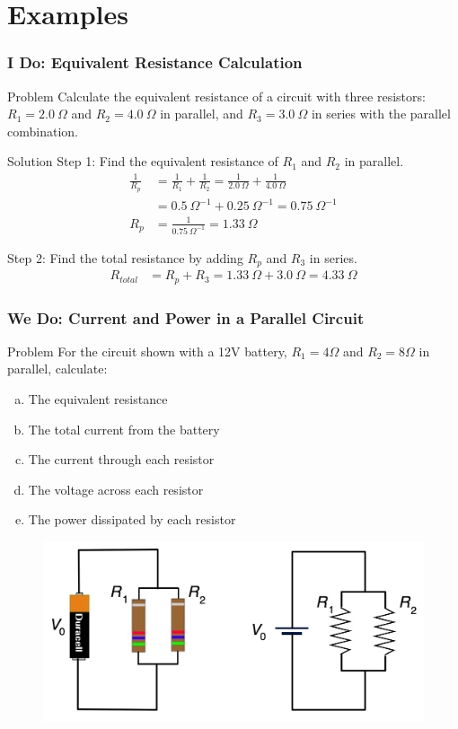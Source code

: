 \documentclass{beamer}
\begin{document}
\section{Examples}
\begin{frame}
    \frametitle{I Do: Equivalent Resistance Calculation}
    \begin{block}{Problem}
        Calculate the equivalent resistance of a circuit with three resistors: $R_1 = 2.0~\Omega$ and $R_2 = 4.0~\Omega$ in parallel, and $R_3 = 3.0~\Omega$ in series with the parallel combination.
    \end{block}
    \begin{block}{Solution}
        Step 1: Find the equivalent resistance of $R_1$ and $R_2$ in parallel.
        \begin{align*}
            \frac{1}{R_p} &= \frac{1}{R_1} + \frac{1}{R_2} = \frac{1}{2.0~\Omega} + \frac{1}{4.0~\Omega}\\
            &= 0.5~\Omega^{-1} + 0.25~\Omega^{-1} = 0.75~\Omega^{-1}\\
            R_p &= \frac{1}{0.75~\Omega^{-1}} = 1.33~\Omega
        \end{align*}
        
        Step 2: Find the total resistance by adding $R_p$ and $R_3$ in series.
        \begin{align*}
            R_{total} &= R_p + R_3 = 1.33~\Omega + 3.0~\Omega = 4.33~\Omega
        \end{align*}
    \end{block}
\end{frame}

\begin{frame}
    \frametitle{We Do: Current and Power in a Parallel Circuit}
    \begin{block}{Problem}
        For the circuit shown with a 12V battery, $R_1 = 4\Omega$ and $R_2 = 8\Omega$ in parallel, calculate:
        \begin{enumerate}[(a)]
            \item The equivalent resistance
            \item The total current from the battery
            \item The current through each resistor
            \item The voltage across each resistor
            \item The power dissipated by each resistor
        \end{enumerate}
    \end{block}
    \begin{figure}
        \centering
        \includegraphics[width=0.5\linewidth]{phys12-circuits-parallel-circuit-with-battery.jpg}
    \end{figure}
\end{frame}
\end{document}
